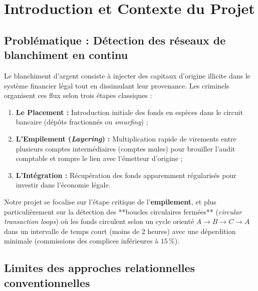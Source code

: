 
\chapter{Introduction et Contexte du Projet}
\label{ch:intro}

\section{Problématique : Détection des réseaux de blanchiment en continu}

Le blanchiment d'argent consiste à injecter des capitaux d'origine illicite dans le système financier légal tout en dissimulant leur provenance. Les criminels organisent ces flux selon trois étapes classiques :
\begin{enumerate}
    \item \textbf{Le Placement :} Introduction initiale des fonds en espèces dans le circuit bancaire (dépôts fractionnés ou \textit{smurfing}) ;
    \item \textbf{L'Empilement (\textit{Layering}) :} Multiplication rapide de virements entre plusieurs comptes intermédiaires (comptes mules) pour brouiller l'audit comptable et rompre le lien avec l'émetteur d'origine ;
    \item \textbf{L'Intégration :} Récupération des fonds apparemment régularisés pour investir dans l'économie légale.
\end{enumerate}


Notre projet se focalise sur l'étape critique de l'\textbf{empilement}, et plus particulièrement sur la détection des **boucles circulaires fermées** (\textit{circular transaction loops}) où les fonds circulent selon un cycle orienté $A \to B \to C \to A$ dans un intervalle de temps court (moins de 2 heures) avec une déperdition minimale (commissions des complices inférieures à $15\,\%$).

\section{Limites des approches relationnelles conventionnelles}


